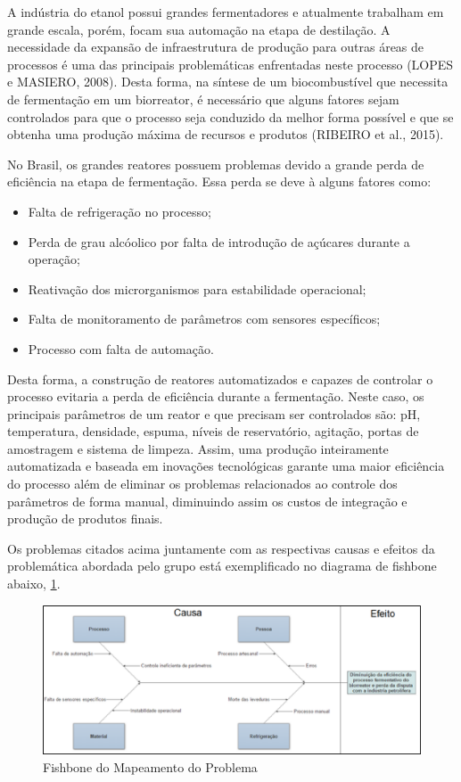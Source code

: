 A indústria do etanol possui grandes fermentadores e atualmente trabalham em grande escala, porém, focam sua automação na etapa de destilação. A necessidade da expansão de infraestrutura de produção para outras áreas de processos é uma das principais problemáticas enfrentadas neste processo (LOPES e MASIERO, 2008). Desta forma, na síntese de um biocombustível que necessita de fermentação em um biorreator, é necessário que alguns fatores sejam controlados para que o processo seja conduzido da melhor forma possível e que se obtenha uma produção máxima de recursos e produtos (RIBEIRO et al., 2015).

No Brasil, os grandes reatores possuem problemas devido a grande perda de eficiência na etapa de fermentação. Essa perda se deve à alguns fatores como:

\begin{itemize}
	\item Falta de refrigeração no processo;
	\item Perda de grau alcóolico por falta de introdução de açúcares durante a operação;
	\item Reativação dos microrganismos para estabilidade operacional;
	\item Falta de monitoramento de parâmetros com sensores específicos;
	\item Processo com falta de automação.
\end{itemize}

Desta forma, a construção de reatores automatizados e capazes de controlar o processo evitaria a perda de eficiência durante a fermentação. Neste caso, os principais parâmetros de um reator e que precisam ser controlados são: pH, temperatura, densidade, espuma, níveis de reservatório, agitação, portas de amostragem e sistema de limpeza. Assim, uma produção inteiramente automatizada e baseada em inovações tecnológicas garante uma maior eficiência do processo além de eliminar os problemas relacionados ao controle dos parâmetros de forma manual, diminuindo assim os custos de integração e produção de produtos finais.

Os problemas citados acima juntamente com as respectivas causas e efeitos da problemática abordada pelo grupo está exemplificado no diagrama de fishbone abaixo, \ref{fishbone}.

\begin{figure}[h]
	\centering
	\includegraphics[keepaspectratio=true,scale=0.8]{figuras/fishbone.eps}
	\caption{Fishbone do Mapeamento do Problema}
	\label{fishbone}
\end{figure}

